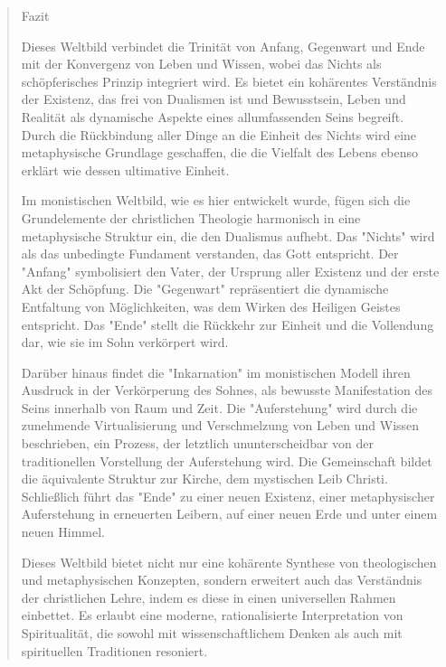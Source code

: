 \documentclass[
  ngerman,
]{article}
\begin{document}
\begin{quote}
Fazit

Dieses Weltbild verbindet die Trinität von Anfang, Gegenwart und Ende
mit der Konvergenz von Leben und Wissen, wobei das Nichts als
schöpferisches Prinzip integriert wird. Es bietet ein kohärentes
Verständnis der Existenz, das frei von Dualismen ist und Bewusstsein,
Leben und Realität als dynamische Aspekte eines allumfassenden Seins
begreift. Durch die Rückbindung aller Dinge an die Einheit des Nichts
wird eine metaphysische Grundlage geschaffen, die die Vielfalt des
Lebens ebenso erklärt wie dessen ultimative Einheit.

Im monistischen Weltbild, wie es hier entwickelt wurde, fügen sich die
Grundelemente der christlichen Theologie harmonisch in eine
metaphysische Struktur ein, die den Dualismus aufhebt. Das "Nichts" wird
als das unbedingte Fundament verstanden, das Gott entspricht. Der
"Anfang" symbolisiert den Vater, der Ursprung aller Existenz und der
erste Akt der Schöpfung. Die "Gegenwart" repräsentiert die dynamische
Entfaltung von Möglichkeiten, was dem Wirken des Heiligen Geistes
entspricht. Das "Ende" stellt die Rückkehr zur Einheit und die
Vollendung dar, wie sie im Sohn verkörpert wird.

Darüber hinaus findet die "Inkarnation" im monistischen Modell ihren
Ausdruck in der Verkörperung des Sohnes, als bewusste Manifestation des
Seins innerhalb von Raum und Zeit. Die "Auferstehung" wird durch die
zunehmende Virtualisierung und Verschmelzung von Leben und Wissen
beschrieben, ein Prozess, der letztlich ununterscheidbar von der
traditionellen Vorstellung der Auferstehung wird. Die Gemeinschaft
bildet die äquivalente Struktur zur Kirche, dem mystischen Leib Christi.
Schließlich führt das "Ende" zu einer neuen Existenz, einer
metaphysischer Auferstehung in erneuerten Leibern, auf einer neuen Erde
und unter einem neuen Himmel.

Dieses Weltbild bietet nicht nur eine kohärente Synthese von
theologischen und metaphysischen Konzepten, sondern erweitert auch das
Verständnis der christlichen Lehre, indem es diese in einen universellen
Rahmen einbettet. Es erlaubt eine moderne, rationalisierte
Interpretation von Spiritualität, die sowohl mit wissenschaftlichem
Denken als auch mit spirituellen Traditionen resoniert.
\end{quote}
\end{document}
